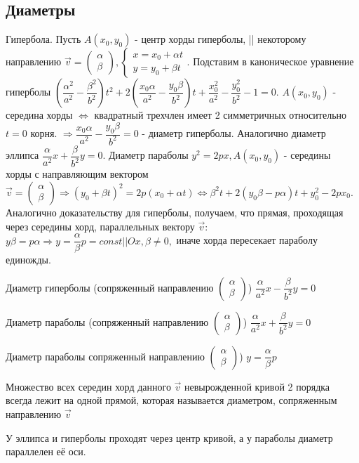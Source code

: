 \subsection{Диаметры}
Гипербола. Пусть \(A(x_0, y_0)\) - центр хорды гиперболы, || некоторому направлению \(\vec v = \begin{pmatrix}
\alpha \\ \beta
\end{pmatrix}, \left\{\begin{gathered}
x = x_0 + \alpha t \\ y = y_0 + \beta t
\end{gathered}\right.\). Подставим в каноническое уравнение гиперболы \((\dfrac{\alpha^2}{a^2} - \dfrac{\beta^2}{b^2})t^2+2(\dfrac{x_0\alpha}{a^2}-\dfrac{y_0\beta}{b^2})t+\dfrac{x_0^2}{a^2} - \dfrac{y_0^2}{b^2} - 1 =0\). \(A(x_0, y_0)\) - середина хорды $\Longleftrightarrow$ квадратный трехчлен имеет 2 симметричных относительно $t = 0$ корня. $\Longrightarrow \dfrac{x_0\alpha}{a^2}-\dfrac{y_0\beta}{b^2} = 0$ - диаметр гиперболы. Аналогично диаметр эллипса \(\dfrac{\alpha}{a^2}x+\dfrac{\beta}{b^2}y=0\). Диаметр параболы \(y^2=2px, A(x_0, y_0)\) - середины хорды с направляющим вектором \(\vec v = \begin{pmatrix}
\alpha \\ \beta
\end{pmatrix} \Longrightarrow (y_0+\beta t)^2 = 2p(x_0+\alpha t)\Longleftrightarrow \beta^2 t+2(y_0\beta - p\alpha)t+y_0^2-2px_0\). Аналогично доказательству для гиперболы, получаем, что прямая, проходящая через середины хорд, параллельных вектору \(\vec v\):\(y\beta = p\alpha\Longrightarrow y =\dfrac{\alpha}{\beta}p=const || Ox, \beta\ne0,\) иначе хорда пересекает параболу единожды.
\begin{definition}
	Диаметр гиперболы (сопряженный направлению \(\begin{pmatrix}
	\alpha \\ \beta		
	\end{pmatrix}\)) \(\dfrac{\alpha}{a^2}x-\dfrac{\beta}{b^2}y=0\)
\end{definition}
\begin{definition}
	Диаметр параболы (сопряженный направлению \(\begin{pmatrix}
		\alpha \\ \beta		
	\end{pmatrix}\)) \(\dfrac{\alpha}{a^2}x+\dfrac{\beta}{b^2}y=0\)
\end{definition}
\begin{definition}
	Диаметр параболы сопряженный направлению \(\begin{pmatrix}
		\alpha \\ \beta		
	\end{pmatrix}\)) \(y = \dfrac{\alpha}{\beta}p\)
\end{definition}
\begin{theorem}
	Множество всех середин хорд данного \(\vec v\) невырожденной кривой 2 порядка всегда лежит на одной прямой, которая называется диаметром, сопряженным направлению $\vec{v}$
\end{theorem}
У эллипса и гиперболы проходят через центр кривой, а у параболы диаметр параллелен её оси.
